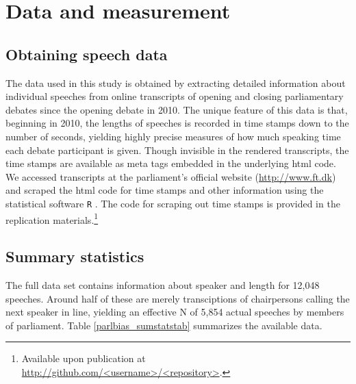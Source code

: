 \documentclass[12pt,a4paper]{article}
\begin{document}


\section{Data and measurement}\label{data}

\subsection{Obtaining speech data}
The data used in this study is obtained by extracting detailed information about individual speeches from online transcripts of opening and closing parliamentary debates since the opening debate in 2010. The unique feature of this data is that, beginning in 2010, the lengths of speeches is recorded in time stamps down to the number of seconds, yielding highly precise measures of how much speaking time each debate participant is given. Though invisible in the rendered transcripts, the time stamps are available as meta tags embedded in the underlying html code. We accessed transcripts at the parliament's official website (\url{http://www.ft.dk}) and scraped the html code for time stamps and other information using the statistical software \texttt{R} \citep{RDevelopmentCoreTeam2011}. The code for scraping out time stamps is provided in the replication materials.\footnote{Available upon publication at \url{http://github.com/<username>/<repository>}.}

\subsection{Summary statistics}
The full data set contains information about speaker and length for 12,048 speeches. Around half of these are merely transciptions of chairpersons calling the next speaker in line, yielding an effective N of 5,854 actual speeches by members of parliament. Table \ref{parlbias_sumstatstab} summarizes the available data. 



\end{document}
